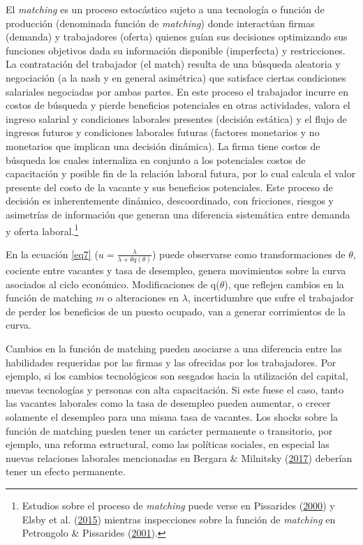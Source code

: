 \documentclass[12pt,oneside]{reedthesis}
\begin{document}
El \emph{matching} es un proceso estocástico sujeto a una tecnología o función de producción (denominada función de \emph{matching}) donde interactúan firmas (demanda) y trabajadores (oferta) quienes guían sus decisiones optimizando sus funciones objetivos dada su información disponible (imperfecta) y restricciones. La contratación del trabajador (el match) resulta de una búsqueda aleatoria y negociación (a la nash y en general asimétrica) que satisface ciertas condiciones salariales negociadas por ambas partes.
En este proceso el trabajador incurre en costos de búsqueda y pierde beneficios potenciales en otras actividades, valora el ingreso salarial y condiciones laborales presentes (decisión estática) y el flujo de ingresos futuros y condiciones laborales futuras (factores monetarios y no monetarios que implican una decisión dinámica). La firma tiene costos de búsqueda los cuales internaliza en conjunto a los potenciales costos de capacitación y posible fin de la relación laboral futura, por lo cual calcula el valor presente del costo de la vacante y sus beneficios potenciales. Este proceso de decisión es inherentemente dinámico, descoordinado, con fricciones, riesgos y asimetrías de información que generan una diferencia sistemática entre demanda y oferta laboral.\footnote{Estudios sobre el proceso de \emph{matching} puede verse en Pissarides (\protect\hyperlink{ref-Pissarides2000}{2000}) y Elsby et al. (\protect\hyperlink{ref-Elsby2015}{2015}) mientras inspecciones sobre la función de \emph{matching} en Petrongolo \& Pissarides (\protect\hyperlink{ref-Petrongolo2001}{2001}).}

En la ecuación \eqref{eq7} (\(u = \frac{\lambda}{\lambda+\theta q(\theta)}\)) puede observarse como transformaciones de \(\theta\), cociente entre vacantes y tasa de desempleo, genera movimientos sobre la curva asociados al ciclo económico. Modificaciones de q(\(\theta\)), que reflejen cambios en la función de matching \(m\) o alteraciones en \(\lambda\), incertidumbre que sufre el trabajador de perder los beneficios de un puesto ocupado, van a generar corrimientos de la curva.

Cambios en la función de matching pueden asociarse a una diferencia entre las habilidades requeridas por las firmas y las ofrecidas por los trabajadores. Por ejemplo, si los cambios tecnológicos son sesgados hacia la utilización del capital, nuevas tecnologías y personas con alta capacitación. Si este fuese el caso, tanto las vacantes laborales como la tasa de desempleo pueden aumentar, o crecer solamente el desempleo para una misma tasa de vacantes. Los shocks sobre la función de matching pueden tener un carácter permanente o transitorio, por ejemplo, una reforma estructural, como las políticas sociales, en especial las nuevas relaciones laborales mencionadas en Bergara \& Milnitsky (\protect\hyperlink{ref-Bergara2017}{2017}) deberían tener un efecto permanente.
\end{document}

